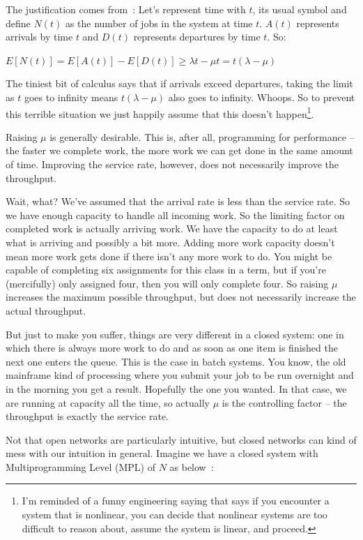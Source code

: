 \documentclass[a4paper]{report}
\begin{document}
The justification comes from~\cite{pmd}: Let's represent time with $t$, its usual symbol and define $N(t)$ as the number of jobs in the system at time $t$. $A(t)$ represents arrivals by time $t$ and $D(t)$ represents departures by time $t$. So:

\begin{center}
	$E[N(t)] = E[A(t)] - E[D(t)] \geq \lambda t - \mu t = t (\lambda - \mu) $
\end{center}

The tiniest bit of calculus says that if arrivals exceed departures, taking the limit as $t$ goes to infinity means $t (\lambda - \mu) $ also goes to infinity. Whoops. So to prevent this terrible situation we just happily assume that this doesn't happen\footnote{I'm reminded of a funny engineering saying that says if you encounter a system that is nonlinear, you can decide that nonlinear systems are too difficult to reason about, assume the system is linear, and proceed.}. 

Raising $\mu$ is generally desirable. This is, after all, programming for performance -- the faster we complete work, the more work we can get done in the same amount of time. Improving the service rate, however, does not necessarily improve the throughput. 

Wait, what? We've assumed that the arrival rate is less than the service rate. So we have enough capacity to handle all incoming work. So the limiting factor on completed work is actually arriving work. We have the capacity to do at least what is arriving and possibly a bit more. Adding more work capacity doesn't mean more work gets done if there isn't any more work to do. You might be capable of completing six assignments for this class in a term, but if you're (mercifully) only assigned four, then you will only complete four. So raising $\mu$ increases the maximum possible throughput, but does not necessarily increase the actual throughput.

But just to make you suffer, things are very different in a closed system: one in which there is always more work to do and as soon as one item is finished the next one enters the queue. This is the case in batch systems. You know, the old mainframe kind of processing where you submit your job to be run overnight and in the morning you get a result. Hopefully the one you wanted. In that case, we are running at capacity all the time, so actually $\mu$ is the controlling factor -- the throughput is exactly the service rate. 

Not that open networks are particularly intuitive, but closed networks can kind of mess with our intuition in general. Imagine we have a closed system with Multiprogramming Level (MPL) of $N$ as below~\cite{pmd}:
\end{document}
